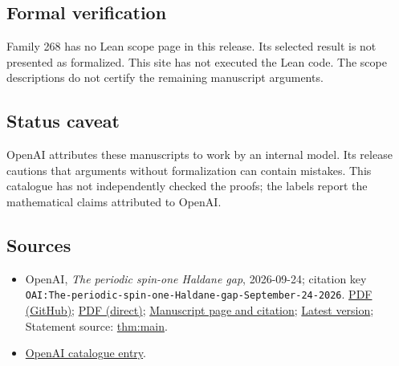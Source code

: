 \documentclass[11pt]{article}
\begin{document}
\subsection{Formal verification}
Family 268 has no Lean scope page in this release. Its selected result is not presented as formalized. This site has not executed the Lean code. The scope descriptions do not certify the remaining manuscript arguments.

\subsection{Status caveat}
OpenAI attributes these manuscripts to work by an internal model. Its release cautions that arguments without formalization can contain mistakes. This catalogue has not independently checked the proofs; the labels report the mathematical claims attributed to OpenAI.

\subsection{Sources}
\begin{itemize}
\item OpenAI, \emph{The periodic spin-one Haldane gap}, 2026-09-24; citation key \texttt{OAI:The-periodic-spin-one-Haldane-gap-September-24-2026}. \href{https://github.com/openai/math/blob/adc7f1241b42e322a6451854ab7e4b4c146bf78a/preprints/The-periodic-spin-one-Haldane-gap-September-24-2026/paper.pdf}{PDF (GitHub)}; \href{https://github.com/openai/math/raw/adc7f1241b42e322a6451854ab7e4b4c146bf78a/preprints/The-periodic-spin-one-Haldane-gap-September-24-2026/paper.pdf}{PDF (direct)}; \href{https://github.com/openai/math/blob/adc7f1241b42e322a6451854ab7e4b4c146bf78a/preprints/The-periodic-spin-one-Haldane-gap-September-24-2026/README.md}{Manuscript page and citation}; \href{https://github.com/openai/math/blob/main/preprints/The-periodic-spin-one-Haldane-gap-September-24-2026/paper.pdf}{Latest version}; Statement source: \href{https://github.com/openai/math/blob/adc7f1241b42e322a6451854ab7e4b4c146bf78a/preprints/The-periodic-spin-one-Haldane-gap-September-24-2026/build/introduction.tex\#L37}{thm:main}.
\item \href{https://github.com/openai/math/blob/adc7f1241b42e322a6451854ab7e4b4c146bf78a/CONTENTS.md}{OpenAI catalogue entry}.
\end{itemize}
\end{document}
